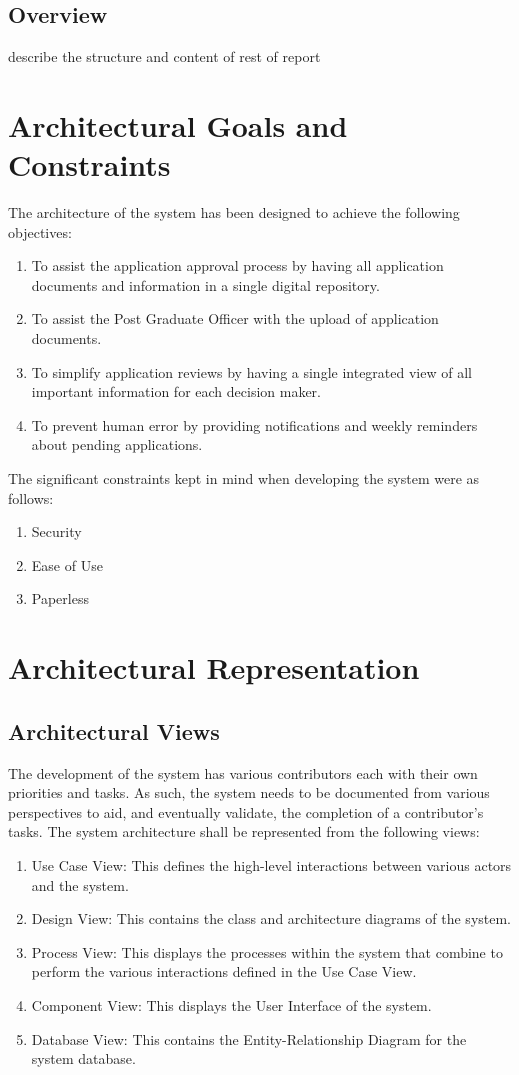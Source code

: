 \documentclass[11pt]{article}
\begin{document}
\subsection{Overview}
describe the structure and content of rest of report
\section{Architectural Goals and Constraints}
The architecture of the system has been designed to achieve the following objectives:
\begin{enumerate}
	\item To assist the application approval process by having all application documents and information in a single digital repository.
	\item To assist the Post Graduate Officer with the upload of application documents.
	\item To simplify application reviews by having a single integrated view of all important information for each decision maker.
	\item To prevent human error by providing notifications and weekly reminders about pending applications.
	
\end{enumerate}

The significant constraints kept in mind when developing the system were as follows:

\begin{enumerate}
	\item Security
	\item Ease of Use
	\item Paperless
\end{enumerate}
\section{Architectural Representation}
\subsection{Architectural Views}
The development of the system has various contributors each with their own priorities and tasks. As such, the system needs to be documented from various perspectives to aid, and eventually validate, the completion of a contributor's tasks. The system architecture shall be represented from the following views:

\begin{enumerate}
	\item Use Case View: This defines the high-level interactions between various actors and the system.
	\item Design View: This contains the class and architecture diagrams of the system.
	\item Process View: This displays the processes within the system that combine to perform the various interactions defined in the Use Case View.
	\item Component View: This displays the User Interface of the system.
	\item Database View: This contains the Entity-Relationship Diagram for the system database.
\end{enumerate} 
\end{document}
